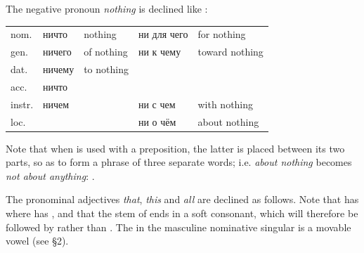 The negative pronoun  \emph{nothing} is declined like :

\begin{center}
\small
\begin{tabular}{@{}l >{\cyrillicfont}l l >{\cyrillicfont}l l@{}}
nom.   & ничто   & nothing    & ни для чего & for nothing\\
gen.   & ничего  & of nothing & ни к чему   & toward nothing\\
dat.   & ничему  & to nothing &             &\\
acc.   & ничто   &            &             &\\
instr. & ничем   &            & ни с чем    & with nothing\\
loc.   &         &            & ни о чём    & about nothing\\
\end{tabular}
\end{center}

Note that when  is used with a preposition, the latter is placed between its two parts, so as to form a phrase of three separate words; i.e. \emph{about nothing} becomes \emph{not about anything}: .

The pronominal adjectives  \emph{that},  \emph{this} and  \emph{all} are declined as follows. Note that  has  where  has , and that the stem  of  ends in a soft consonant, which will therefore be followed by  rather than . The  in the masculine nominative singular  is a movable vowel (see §2).


